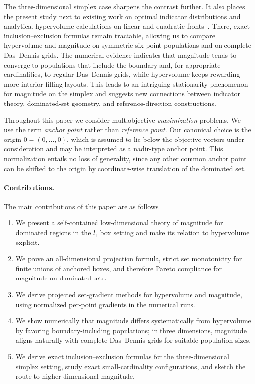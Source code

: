 \documentclass{article}
\def\ell{l}%
\theoremstyle{definition}
\newcommand{\1}{\mathbf{1}}
\begin{document}
The three-dimensional simplex case sharpens the contrast further. It also places the present study next to existing work on optimal indicator distributions and analytical hypervolume calculations on linear and quadratic fronts~\cite{Brockhoff2010,IshibuchiImadaMasuyamaNojima2019,Singh2025,IshibuchiNanPang2025}. There, exact inclusion--exclusion formulas remain tractable, allowing us to compare hypervolume and magnitude on symmetric six-point populations and on complete Das--Dennis grids. The numerical evidence indicates that magnitude tends to converge to populations that include the boundary and, for appropriate cardinalities, to regular Das--Dennis grids, while hypervolume keeps rewarding more interior-filling layouts. This leads to an intriguing stationarity phenomenon for magnitude on the simplex and suggests new connections between indicator theory, dominated-set geometry, and reference-direction constructions.

Throughout this paper we consider multiobjective \emph{maximization} problems. We use the term \emph{anchor point} rather than \emph{reference point}. Our canonical choice is the origin $0=(0,\dots,0)$, which is assumed to lie below the objective vectors under consideration and may be interpreted as a nadir-type anchor point. This normalization entails no loss of generality, since any other common anchor point can be shifted to the origin by coordinate-wise translation of the dominated set.

\paragraph{Contributions.}
The main contributions of this paper are as follows.
\begin{enumerate}[leftmargin=2em]
\item We present a self-contained low-dimensional theory of magnitude for dominated regions in the $\ell_1$ box setting and make its relation to hypervolume explicit.
\item We prove an all-dimensional projection formula, strict set monotonicity for finite unions of anchored boxes, and therefore Pareto compliance for magnitude on dominated sets.
\item We derive projected set-gradient methods for hypervolume and magnitude, using normalized per-point gradients in the numerical runs.
\item We show numerically that magnitude differs systematically from hypervolume by favoring boundary-including populations; in three dimensions, magnitude aligns naturally with complete Das--Dennis grids for suitable population sizes.
\item We derive exact inclusion--exclusion formulas for the three-dimensional simplex setting, study exact small-cardinality configurations, and sketch the route to higher-dimensional magnitude.
\end{enumerate}
\end{document}
